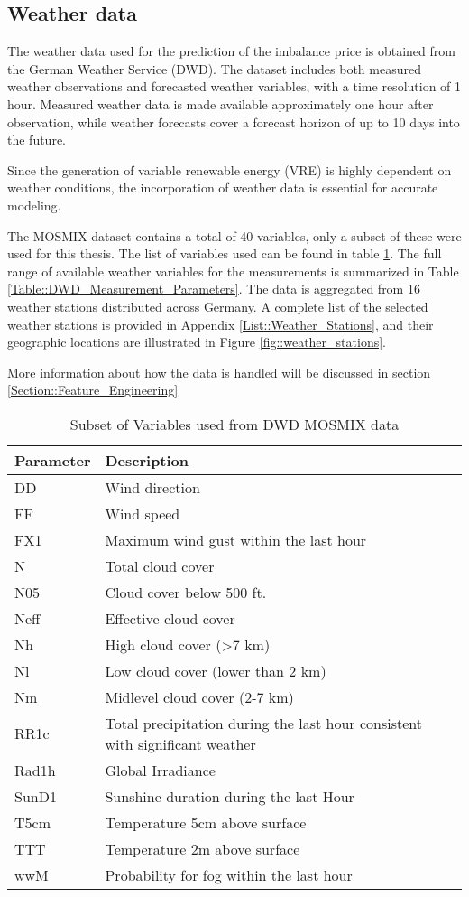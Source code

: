 \documentclass[class=scrbook, crop=false]{standalone}
\begin{document}
\subsection{Weather data}
\label{Section::Weather_Data}

The weather data used for the prediction of the imbalance price is obtained from the German Weather Service (DWD).
The dataset includes both measured weather observations and forecasted weather variables, with a time resolution of 1 hour.
Measured weather data is made available approximately one hour after observation, while weather forecasts cover a forecast horizon of up to 10 days into the future.

Since the generation of variable renewable energy (VRE) is highly dependent on weather conditions, the incorporation of weather data is essential for accurate modeling.

The MOSMIX dataset contains a total of 40 variables, only a subset of these were used for this thesis. The list of variables used can be found in table \ref{Table::DWD_MOSMIX_Parameters_Small}. 
The full range of available weather variables for the measurements is summarized in Table \ref{Table::DWD_Measurement_Parameters}.
The data is aggregated from 16 weather stations distributed across Germany.
A complete list of the selected weather stations is provided in Appendix \ref{List::Weather_Stations}, and their geographic locations are illustrated in Figure \ref{fig::weather_stations}.

More information about how the data is handled will be discussed in section \ref{Section::Feature_Engineering}


\begin{table}[]
\centering
\begin{tabular}{l|l}
Parameter & Description \\\hline
DD & Wind direction\\
FF & Wind speed\\
FX1 & Maximum wind gust within the last hour\\
N & Total cloud cover\\
N05 & Cloud cover below 500 ft.\\
Neff & Effective cloud cover\\
Nh & High cloud cover (>7 km)\\
Nl & Low cloud cover (lower than 2 km)\\
Nm & Midlevel cloud cover (2-7 km)\\
RR1c & Total precipitation during the last hour consistent with significant weather\\
Rad1h & Global Irradiance\\
SunD1 & Sunshine duration during the last Hour\\
T5cm & Temperature 5cm above surface\\
TTT & Temperature 2m above surface\\
wwM & Probability for fog within the last hour\\
\end{tabular}
\caption{Subset of Variables used from DWD MOSMIX data}
\label{Table::DWD_MOSMIX_Parameters_Small}
\end{table}
\end{document}
